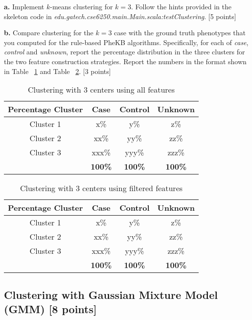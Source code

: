 \documentclass[12pt]{article}
\begin{document}
\textbf{a.} Implement $k$-means clustering for $k=3$. Follow the hints provided in the skeleton code in \textit{edu.gatech.cse6250.main.Main.scala:testClustering}. [5 points]

\textbf{b.} Compare clustering for the $k=3$ case with the ground truth phenotypes that you computed for the rule-based PheKB algorithms. Specifically, for each of \textit{case}, \textit{control} and \textit{unknown}, report the percentage distribution in the three clusters for the two feature construction strategies. Report the numbers in the format shown in Table ~\ref{tbl:kmeansall} and Table ~\ref{tbl:kmeansfil}. [3 points]\\

\begin{table}[h]
\centering
\begin{tabular}{ c | c | c | c }
  \hline
  Percentage Cluster & Case & Control & Unknown\\
  \hline                       
  Cluster 1 & x\% & y\% & z\% \\
  Cluster 2 & xx\% & yy\% & zz\% \\
  Cluster 3 & xxx\% & yyy\% & zzz\% \\
  \hline  
   & \bf{100\%} & \bf{100\%} & \bf{100\%} \\
  \hline  
\end{tabular}
\caption{Clustering with 3 centers using all features}
\label{tbl:kmeansall}
\end{table}

\begin{table}[h]
\centering
\begin{tabular}{ c | c | c | c }
  \hline
  Percentage Cluster & Case & Control & Unknown\\
  \hline                       
  Cluster 1 & x\% & y\% & z\% \\
  Cluster 2 & xx\% & yy\% & zz\% \\
  Cluster 3 & xxx\% & yyy\% & zzz\% \\
  \hline  
   & \bf{100\%} & \bf{100\%} & \bf{100\%} \\
  \hline  
\end{tabular}
\caption{Clustering with 3 centers using filtered features}
\label{tbl:kmeansfil}
\end{table}

\subsection{Clustering with Gaussian Mixture Model (GMM) [8 points]}
\end{document}
